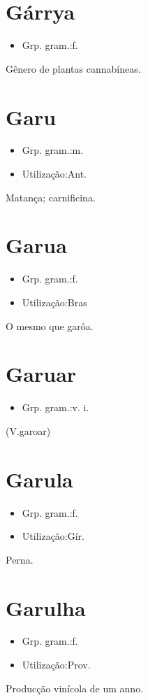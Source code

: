 \section{Gárrya}
\begin{itemize}
\item {Grp. gram.:f.}
\end{itemize}
Gênero de plantas cannabíneas.
\section{Garu}
\begin{itemize}
\item {Grp. gram.:m.}
\end{itemize}
\begin{itemize}
\item {Utilização:Ant.}
\end{itemize}
Matança; carnificina.
\section{Garua}
\begin{itemize}
\item {Grp. gram.:f.}
\end{itemize}
\begin{itemize}
\item {Utilização:Bras}
\end{itemize}
O mesmo que \textunderscore garôa\textunderscore .
\section{Garuar}
\begin{itemize}
\item {Grp. gram.:v. i.}
\end{itemize}
(V.garoar)
\section{Garula}
\begin{itemize}
\item {Grp. gram.:f.}
\end{itemize}
\begin{itemize}
\item {Utilização:Gír.}
\end{itemize}
Perna.
\section{Garulha}
\begin{itemize}
\item {Grp. gram.:f.}
\end{itemize}
\begin{itemize}
\item {Utilização:Prov.}
\end{itemize}
Producção vinícola de um anno.
